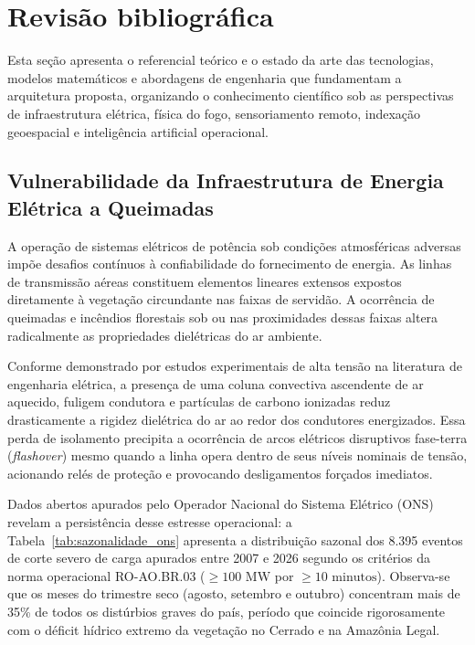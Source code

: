 \newpage
\section{Revisão bibliográfica}
\label{sc:revisao}

Esta seção apresenta o referencial teórico e o estado da arte das tecnologias, modelos matemáticos e abordagens de engenharia que fundamentam a arquitetura proposta, organizando o conhecimento científico sob as perspectivas de infraestrutura elétrica, física do fogo, sensoriamento remoto, indexação geoespacial e inteligência artificial operacional.

\subsection{Vulnerabilidade da Infraestrutura de Energia Elétrica a Queimadas}
\label{sbc:vulnerabilidade_sin}

A operação de sistemas elétricos de potência sob condições atmosféricas adversas impõe desafios contínuos à confiabilidade do fornecimento de energia. As linhas de transmissão aéreas constituem elementos lineares extensos expostos diretamente à vegetação circundante nas faixas de servidão. A ocorrência de queimadas e incêndios florestais sob ou nas proximidades dessas faixas altera radicalmente as propriedades dielétricas do ar ambiente.

Conforme demonstrado por estudos experimentais de alta tensão na literatura de engenharia elétrica, a presença de uma coluna convectiva ascendente de ar aquecido, fuligem condutora e partículas de carbono ionizadas reduz drasticamente a rigidez dielétrica do ar ao redor dos condutores energizados. Essa perda de isolamento precipita a ocorrência de arcos elétricos disruptivos fase-terra (\textit{flashover}) mesmo quando a linha opera dentro de seus níveis nominais de tensão, acionando relés de proteção e provocando desligamentos forçados imediatos.

Dados abertos apurados pelo Operador Nacional do Sistema Elétrico (ONS) revelam a persistência desse estresse operacional: a Tabela~\ref{tab:sazonalidade_ons} apresenta a distribuição sazonal dos 8.395 eventos de corte severo de carga apurados entre 2007 e 2026 segundo os critérios da norma operacional RO-AO.BR.03 ($\ge 100\text{ MW}$ por $\ge 10\text{ minutos}$). Observa-se que os meses do trimestre seco (agosto, setembro e outubro) concentram mais de 35\% de todos os distúrbios graves do país, período que coincide rigorosamente com o déficit hídrico extremo da vegetação no Cerrado e na Amazônia Legal.

